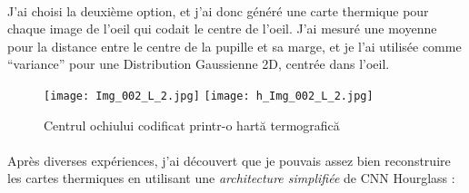 \paragraph{}
J'ai choisi la deuxième option, et j'ai donc généré une carte thermique pour chaque image de l'oeil qui codait le centre de l'oeil.
J'ai mesuré une moyenne pour la distance entre le centre de la pupille et sa marge, et je l'ai utilisée comme ``variance'' pour une Distribution Gaussienne 2D, centrée dans l'oeil.

\begin{figure}[h]
    \centering
    \texttt{[image: Img\_002\_L\_2.jpg]}
    \texttt{[image: h\_Img\_002\_L\_2.jpg]}
    \caption{Centrul ochiului codificat printr-o hartă termografică}
\end{figure}

\clearpage

\paragraph{}
Après diverses expériences, j'ai découvert que je pouvais assez bien reconstruire les cartes thermiques en utilisant une \emph{architecture simplifiée} de CNN Hourglass :

